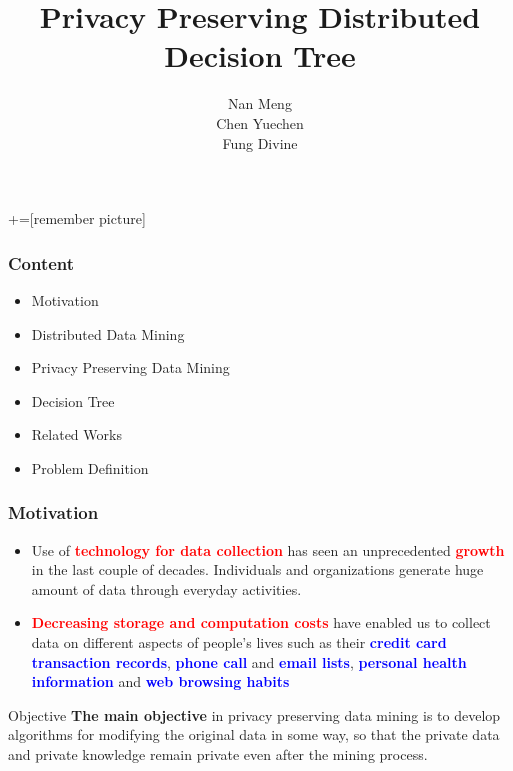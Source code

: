 \documentclass{beamer} %
\author{Nan Meng \\ Chen Yuechen \\ Fung Divine}
\title{Privacy Preserving Distributed Decision Tree}
\institute[] %
{
University of Hong Kong \\ %
\medskip
\textit{u3003637@connect.hku.hk} %
}
\newcommand{\blue}[1]{\textcolor{blue}{#1}}
\newcommand{\red}[1]{\textcolor{red}{#1}}
\begin{document}
+=[remember picture]

\everymath{\displaystyle}


\begin{frame}
  \titlepage
\end{frame}



\begin{frame}
\frametitle{Content}
\begin{itemize} \itemsep16pt \parskip0pt 
\item Motivation
\item Distributed Data Mining
\item Privacy Preserving Data Mining
\item Decision Tree
\item Related Works
\item Problem Definition
\end{itemize}
\end{frame}


\begin{frame}
\frametitle{Motivation}
\begin{itemize} \itemsep16pt \parskip0pt 
\item Use of \red{\bf technology for data collection} has seen an unprecedented \red{\bf growth} in the last couple of decades. Individuals and organizations generate huge amount of data through everyday activities.
\item \red{\bf Decreasing storage and computation costs} have enabled us to collect data on different aspects of people's lives such as their \blue{\bf credit card transaction records}, \blue{\bf phone call} and \blue{\bf email lists}, \blue{\bf personal health information} and \blue{\bf web browsing habits}
\end{itemize}


\begin{block}{Objective}
{\bf The main objective} in privacy preserving data mining is
to develop algorithms for modifying the original data
in some way, so that the private data and private
knowledge remain private even after the mining process.
\end{block}
\end{frame}
\end{document}
